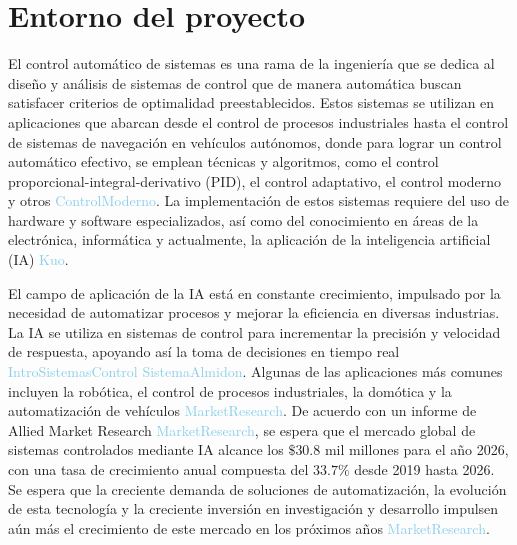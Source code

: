 \section{Entorno del proyecto}

El control automático de sistemas es una rama de la ingeniería que se dedica al diseño y análisis de sistemas de control que de manera automática buscan satisfacer criterios de optimalidad preestablecidos. Estos sistemas se utilizan en aplicaciones que abarcan desde el control de procesos industriales hasta el control de sistemas de navegación en vehículos autónomos, donde para lograr un control automático efectivo, se emplean técnicas y algoritmos, como el control proporcional-integral-derivativo (PID), el control adaptativo, el control moderno y otros \textcolor{SkyBlue}{ControlModerno}. La implementación de estos sistemas requiere del uso de hardware y software especializados, así como del conocimiento en áreas de la electrónica, informática y actualmente, la aplicación de la inteligencia artificial (IA) \textcolor{SkyBlue}{Kuo}.

El campo de aplicación de la IA está en constante crecimiento, impulsado por la necesidad de automatizar procesos y mejorar la eficiencia en diversas industrias. La IA se utiliza en sistemas de control para incrementar la precisión y velocidad de respuesta, apoyando así la toma de decisiones en tiempo real \textcolor{SkyBlue}{IntroSistemasControl} \textcolor{SkyBlue}{SistemaAlmidon}. Algunas de las aplicaciones más comunes incluyen la robótica, el control de procesos industriales, la domótica y la automatización de vehículos \textcolor{SkyBlue}{MarketResearch}. De acuerdo con un informe de Allied Market Research \textcolor{SkyBlue}{MarketResearch}, se espera que el mercado global de sistemas controlados mediante IA alcance los $\$ 30.8$ mil millones para el año 2026, con una tasa de crecimiento anual compuesta del $33.7\%$ desde 2019 hasta 2026. Se espera que la creciente demanda de soluciones de automatización, la evolución de esta tecnología y la creciente inversión en investigación y desarrollo impulsen aún más el crecimiento de este mercado en los próximos años \textcolor{SkyBlue}{MarketResearch}.

